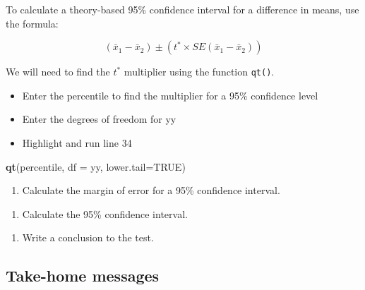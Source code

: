 \documentclass[
]{report}
\newenvironment{Shaded}{\begin{snugshade}}{\end{snugshade}}
\newcommand{\AttributeTok}[1]{\textcolor[rgb]{0.13,0.29,0.53}{#1}}
\newcommand{\ConstantTok}[1]{\textcolor[rgb]{0.56,0.35,0.01}{#1}}
\newcommand{\FunctionTok}[1]{\textcolor[rgb]{0.13,0.29,0.53}{\textbf{#1}}}
\newcommand{\NormalTok}[1]{#1}
\providecommand{\tightlist}{%
  \setlength{\itemsep}{0pt}\setlength{\parskip}{0pt}}
\begin{document}
To calculate a theory-based 95\% confidence interval for a difference in means, use the formula:

\[(\bar{x}_1- \bar{x}_2)\pm (t^* \times SE(\bar{x}_1- \bar{x}_2))\]

We will need to find the \(t^*\) multiplier using the function \texttt{qt()}.

\begin{itemize}
\item
  Enter the percentile to find the multiplier for a 95\% confidence level
\item
  Enter the degrees of freedom for yy
\item
  Highlight and run line 34
\end{itemize}

\begin{Shaded}
\begin{Highlighting}[]
\FunctionTok{qt}\NormalTok{(percentile, }\AttributeTok{df =}\NormalTok{ yy, }\AttributeTok{lower.tail=}\ConstantTok{TRUE}\NormalTok{)}
\end{Highlighting}
\end{Shaded}

\begin{enumerate}
\def\labelenumi{\arabic{enumi}.}
\setcounter{enumi}{8}
\tightlist
\item
  Calculate the margin of error for a 95\% confidence interval.
\end{enumerate}

\vspace{0.5in}

\begin{enumerate}
\def\labelenumi{\arabic{enumi}.}
\setcounter{enumi}{9}
\tightlist
\item
  Calculate the 95\% confidence interval.
\end{enumerate}

\vspace{0.6in}

\begin{enumerate}
\def\labelenumi{\arabic{enumi}.}
\setcounter{enumi}{10}
\tightlist
\item
  Write a conclusion to the test.
  \vspace{0.7in}
\end{enumerate}

\subsection{Take-home messages}\label{take-home-messages-22}
\end{document}
